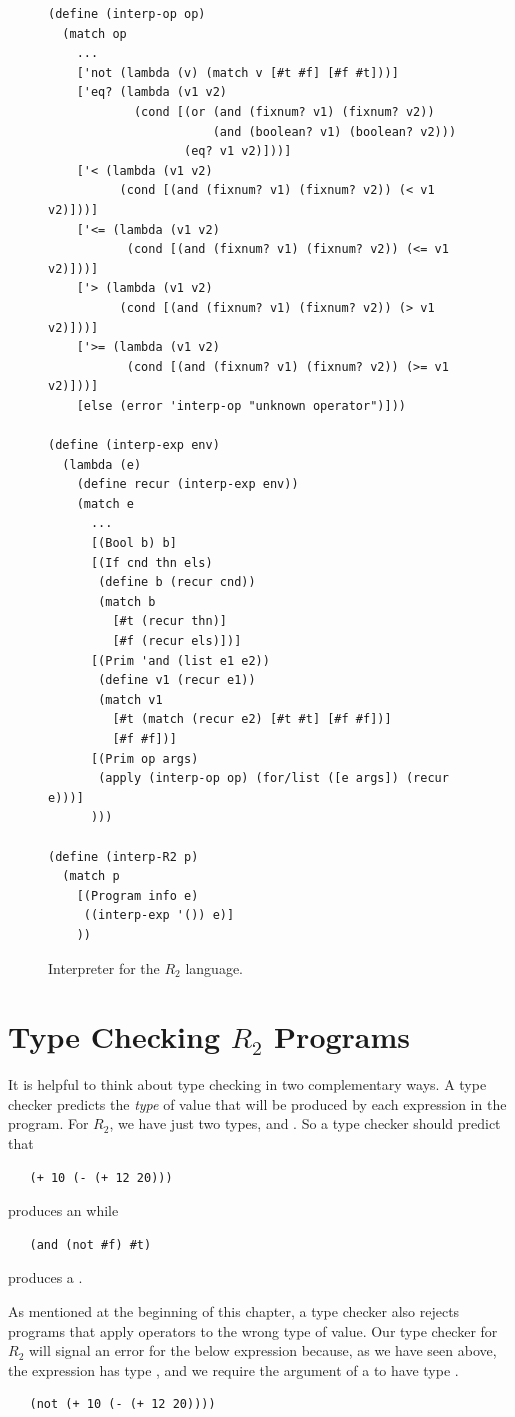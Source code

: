 \documentclass[11pt]{book}
\begin{document}
\begin{figure}[tbp]
\begin{lstlisting}
(define (interp-op op)
  (match op
    ...
    ['not (lambda (v) (match v [#t #f] [#f #t]))]
    ['eq? (lambda (v1 v2)
            (cond [(or (and (fixnum? v1) (fixnum? v2))
                       (and (boolean? v1) (boolean? v2)))
                   (eq? v1 v2)]))]
    ['< (lambda (v1 v2)
          (cond [(and (fixnum? v1) (fixnum? v2)) (< v1 v2)]))]
    ['<= (lambda (v1 v2)
           (cond [(and (fixnum? v1) (fixnum? v2)) (<= v1 v2)]))]
    ['> (lambda (v1 v2)
          (cond [(and (fixnum? v1) (fixnum? v2)) (> v1 v2)]))]
    ['>= (lambda (v1 v2)
           (cond [(and (fixnum? v1) (fixnum? v2)) (>= v1 v2)]))]
    [else (error 'interp-op "unknown operator")]))

(define (interp-exp env)
  (lambda (e)
    (define recur (interp-exp env))
    (match e
      ...
      [(Bool b) b]
      [(If cnd thn els)
       (define b (recur cnd))
       (match b
         [#t (recur thn)]
         [#f (recur els)])]
      [(Prim 'and (list e1 e2))
       (define v1 (recur e1))
       (match v1
         [#t (match (recur e2) [#t #t] [#f #f])]
         [#f #f])]
      [(Prim op args)
       (apply (interp-op op) (for/list ([e args]) (recur e)))]
      )))

(define (interp-R2 p)
  (match p
    [(Program info e)
     ((interp-exp '()) e)]
    ))
\end{lstlisting}
\caption{Interpreter for the $R_2$ language.}
\label{fig:interp-R2}
\end{figure}


\section{Type Checking $R_2$ Programs}
\label{sec:type-check-r2}

It is helpful to think about type checking in two complementary
ways. A type checker predicts the \emph{type} of value that will be
produced by each expression in the program.  For $R_2$, we have just
two types,  and . So a type checker should
predict that
\begin{lstlisting}
   (+ 10 (- (+ 12 20)))
\end{lstlisting}
produces an  while
\begin{lstlisting}
   (and (not #f) #t)
\end{lstlisting}
produces a .

As mentioned at the beginning of this chapter, a type checker also
rejects programs that apply operators to the wrong type of value. Our
type checker for $R_2$ will signal an error for the below expression
because, as we have seen above, the expression  has
type , and we require the argument of a  to
have type .
\begin{lstlisting}
   (not (+ 10 (- (+ 12 20))))
\end{lstlisting}
\end{document}
